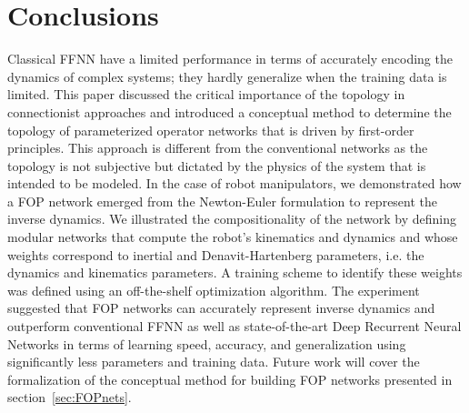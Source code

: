 \section{Conclusions}\label{sec:conclusion}
Classical FFNN have a limited performance in terms of accurately encoding the dynamics of complex systems; they hardly generalize when the training data is limited. This paper discussed the critical importance of the topology in connectionist approaches and introduced a conceptual method to determine the topology of parameterized operator networks that is driven by first-order principles. This approach is different from the conventional networks as the topology is not subjective but dictated by the physics of the system that is intended to be modeled. In the case of robot manipulators, we demonstrated how a FOP network emerged from the Newton-Euler formulation to represent the inverse dynamics. We illustrated the compositionality of the network by defining modular networks that compute the robot's kinematics and dynamics and whose weights correspond to inertial and Denavit-Hartenberg parameters, i.e. the dynamics and kinematics parameters. A training scheme to identify these weights was defined using an off-the-shelf optimization algorithm. The experiment suggested that FOP networks can accurately represent inverse dynamics and outperform conventional FFNN as well as state-of-the-art Deep Recurrent Neural Networks in terms of learning speed, accuracy, and generalization using significantly less parameters and training data. Future work will cover the formalization of the conceptual method for building FOP networks presented in section~\ref{sec:FOPnets}. 

